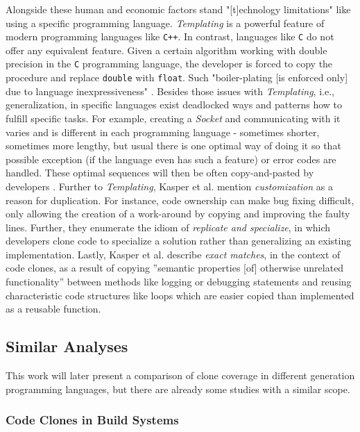 Alongside these human and economic factors stand "[t]echnology limitations" \cite{kasper2006cloning} like using a specific programming language.
\textit{Templating} is a powerful feature of modern programming languages like \texttt{C++}. In contrast, languages like \texttt{C} do not offer any equivalent feature.
Given a certain algorithm working with double precision in the \texttt{C} programming language, the developer is forced to copy the procedure and replace \texttt{double} with \texttt{float}. Such "boiler-plating [is enforced only] due to language inexpressiveness" \cite{kasper2006cloning}. 
Besides those issues with \textit{Templating}, i.e., generalization, in specific languages exist deadlocked ways and patterns how to fulfill specific tasks.
For example, creating a \textit{Socket} and communicating with it varies and is different in each programming language - sometimes shorter, sometimes more lengthy, but usual there is one optimal way of doing it so that possible exception (if the language even has such a feature) or error codes are handled. These optimal sequences will then be often copy-and-pasted by developers \cite{kasper2006cloning}.
Further to \textit{Templating}, Kasper et al.  \cite{kasper2006cloning} mention \textit{customization} as a reason for duplication.
For instance, code ownership can make bug fixing difficult, only allowing the creation of a work-around by copying and improving the faulty lines.
Further, they enumerate the idiom of \textit{replicate and specialize}, in which developers clone code to specialize a solution rather than generalizing an existing implementation.
Lastly, Kasper et al. \cite{kasper2006cloning} describe \textit{exact matches}, in the context of code clones, as a result of copying ”semantic properties [of] otherwise unrelated functionality” \cite{kasper2006cloning} between methods like logging or debugging statements and reusing characteristic code structures like loops which are easier copied than implemented as a reusable function.

\subsection{Similar Analyses}
\label{sec:similiar_analyses}

This work will later present a comparison of clone coverage in different generation programming languages, but there are already some studies with a similar scope.

\subsubsection{Code Clones in Build Systems}

